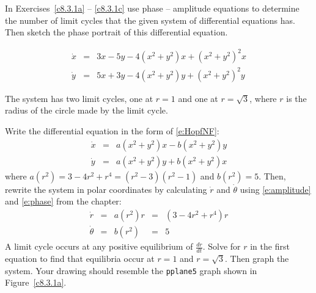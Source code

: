\documentclass{ximera}
\begin{document}
\TEXER

\noindent In Exercises~\ref{c8.3.1a} -- \ref{c8.3.1c} use phase -- amplitude 
equations to determine the number of limit cycles that the given system of 
differential equations has.   Then sketch the phase portrait of this 
differential equation.
\begin{exercise} \label{c8.3.1a}
\[
\begin{array}{rcl}
\dot{x} & = &  3x-5y - 4(x^2+y^2)x + (x^2+y^2)^2x\\
\dot{y} & = &  5x+3y - 4(x^2+y^2)y + (x^2+y^2)^2y
\end{array} 
\]

\begin{solution}

\ans The system has two limit cycles, one at $r = 1$ and one at $r =
\sqrt{3}$, where $r$ is the radius of the circle made by the limit cycle.

\soln Write the differential equation in the form of \eqref{e:HopfNF}:
\[ \begin{array}{rcl}
\dot{x} & = & a(x^2 + y^2)x - b(x^2 + y^2)y \\
\dot{y} & = & a(x^2 + y^2)y + b(x^2 + y^2)x \end{array}
\]
where $a(r^2) = 3 - 4r^2 + r^4=(r^2-3)(r^2-1)$ and $b(r^2) = 5$.  Then,
rewrite the system in polar coordinates by calculating $\dot{r}$ and
$\dot{\theta}$ using \eqref{e:amplitude} and \eqref{e:phase} from the
chapter:
\[ \begin{array}{rcccl}
\dot{r} & = & a(r^2)r & = & (3 - 4r^2 + r^4)r \\
\dot{\theta} & = & b(r^2) & = & 5 \end{array}
\]
A limit cycle occurs at any positive equilibrium of $\frac{dr}{dt}$.
Solve for $r$ in the first equation to find that equilibria occur
at $r = 1$ and $r = \sqrt{3}$.  Then graph the system.  Your drawing
should resemble the {\tt pplane5} graph shown in Figure~\ref{c8.3.1a}.

\begin{figure}[htb]
                       \centerline{%
                       }
\end{figure}


\end{solution}
\end{exercise}
\end{document}
